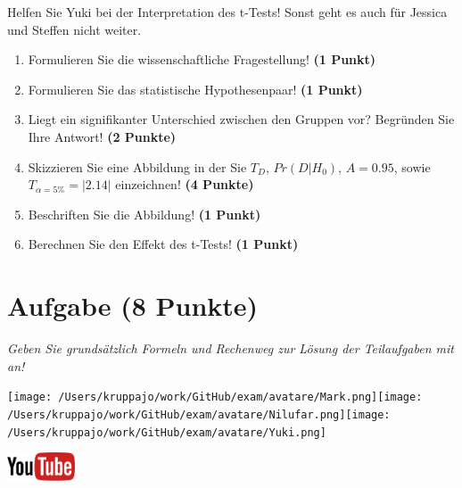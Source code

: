 \documentclass[a4paper, 9pt]{scrartcl}\usepackage[]{graphicx}\usepackage[]{xcolor}
\begin{document}
Helfen Sie Yuki bei der Interpretation des t-Tests! Sonst geht es auch für Jessica und Steffen nicht weiter.
  
\begin{enumerate}
  \item Formulieren Sie die wissenschaftliche Fragestellung! \textbf{(1 Punkt)}
  \item Formulieren Sie das statistische Hypothesenpaar! \textbf{(1 Punkt)}
\item Liegt ein signifikanter Unterschied zwischen den Gruppen vor? Begründen Sie Ihre Antwort! \textbf{(2 Punkte)}
\item Skizzieren Sie eine Abbildung in der Sie $T_{D}$, $Pr(D|H_0)$, $A=0.95$, sowie $T_{\alpha=5\%} = |2.14|$ einzeichnen! \textbf{(4 Punkte)}
\item Beschriften Sie die Abbildung! \textbf{(1 Punkt)}  
\item Berechnen Sie den Effekt des t-Tests! \textbf{(1 Punkt)}
\end{enumerate} 
\clearpage

\section{Aufgabe \hfill (8 Punkte)}

\textit{Geben Sie grundsätzlich Formeln und Rechenweg zur Lösung der Teilaufgaben mit an!} \\[1Ex]
 

 
\begin{minipage}[t]{0.5\textwidth}
\texttt{[image: /Users/kruppajo/work/GitHub/exam/avatare/Mark.png]}\hspace{-4mm}\texttt{[image: /Users/kruppajo/work/GitHub/exam/avatare/Nilufar.png]}\hspace{-4mm}\texttt{[image: /Users/kruppajo/work/GitHub/exam/avatare/Yuki.png]}
\end{minipage}
\begin{minipage}[t]{0.5\textwidth}
\hfill
\href{https://youtu.be/wJqsNV1hOW8}{\includegraphics[width = 2cm]{img/youtube}}
\end{minipage}
\vspace{1ex}
\end{document}
